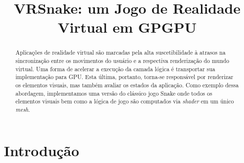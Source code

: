\documentclass[conference]{IEEEtran}
\begin{document}
\title{VRSnake: um Jogo de Realidade Virtual em GPGPU}


\author{}



\maketitle

\begin{abstract}
Aplicações de realidade virtual são marcadas pela alta suscetibilidade à atrasos na sincronização entre os movimentos do usuário e a respectiva renderização do mundo virtual. Uma forma de acelerar a execução da camada lógica é transportar sua implementação para GPU. Esta última, portanto, torna-se responsável por renderizar os elementos visuais, mas também avaliar os estados da aplicação. Como exemplo dessa abordagem, implementamos uma versão do clássico jogo Snake onde todos os elementos visuais bem como a lógica de jogo são computados via \textit{shader} em um único \textit{mesh}.
\end{abstract}


\IEEEpeerreviewmaketitle

\section{Introdução} \label{sec:introduction}
\end{document}
